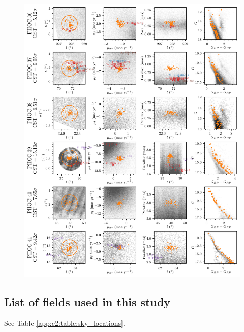 \begin{figure}[ht]
   \centering
   \includegraphics[width=\textwidth]{fig/c2/fig_new_ocs_6.pdf}
   \caption[Plots of the new OCs PHOC 36 to 41]{}%
   \label{app:c2:fig:new_ocs_6}
\end{figure}






\subsection{List of fields used in this study}\label{app:c2:fields}

See Table \ref{app:c2:table:sky_locations}.

